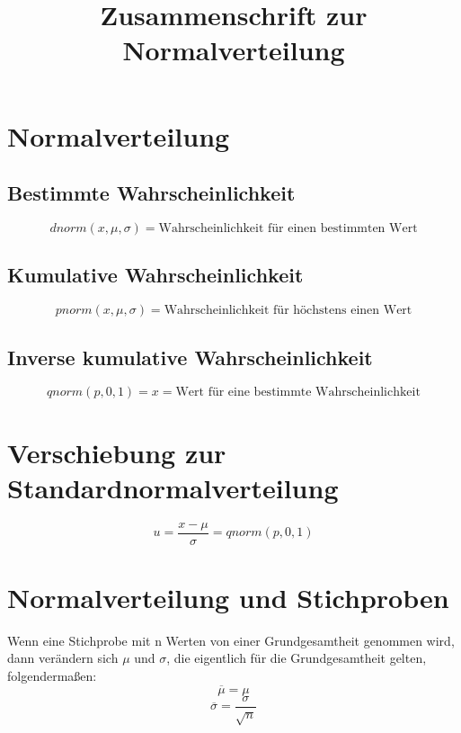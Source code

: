 \documentclass[a4paper,10pt]{article}
\title{Zusammenschrift zur Normalverteilung}
\begin{document}
\maketitle
\thispagestyle{fancy}

\section{Normalverteilung}
\label{sec:normalverteilung}
\subsection{Bestimmte Wahrscheinlichkeit}
\begin{equation}
  dnorm(x, \mu, \sigma) = \text{Wahrscheinlichkeit für einen bestimmten Wert}
\end{equation}

\subsection{Kumulative Wahrscheinlichkeit}
\begin{equation}
  pnorm(x, \mu, \sigma) = \text{Wahrscheinlichkeit für höchstens einen Wert}
\end{equation}

\subsection{Inverse kumulative Wahrscheinlichkeit}
\begin{equation}
  qnorm(p, 0, 1) = x = \text{Wert für eine bestimmte Wahrscheinlichkeit}
\end{equation}

\section{Verschiebung zur Standardnormalverteilung}
\begin{equation}
  u = \frac{x - \mu}{\sigma} = qnorm(p, 0, 1)
\end{equation}

\section{Normalverteilung und Stichproben}
Wenn eine Stichprobe mit n Werten von einer Grundgesamtheit genommen
wird, dann verändern sich $ \mu $ und $ \sigma $, die eigentlich für
die Grundgesamtheit gelten, folgendermaßen:
\begin{equation}
  \overline{\mu} = \mu
\end{equation}
\begin{equation}
  \overline{\sigma} = \frac{\sigma}{\sqrt{n}}
\end{equation}
\end{document}
